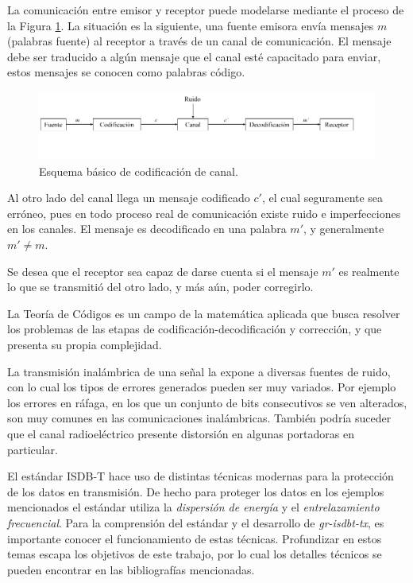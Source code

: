 La comunicación entre emisor y receptor puede modelarse mediante el proceso de la Figura \ref{diagrama_codificacion}. La situación es la siguiente, una fuente emisora envía mensajes $m$ (palabras fuente) al receptor a través de un canal de comunicación. El mensaje debe ser traducido a algún mensaje que el canal esté capacitado para enviar, estos mensajes se conocen como palabras código.

\begin{figure}
\centering
\includegraphics[scale=0.45]{figuras/cap02/diagrama_codificacion}
\caption{\label{diagrama_codificacion} Esquema básico de codificación de canal.}
\end{figure}

Al otro lado del canal llega un mensaje codificado $c'$, el cual seguramente sea erróneo, pues en todo proceso real de comunicación existe ruido e imperfecciones en los canales. El mensaje es decodificado en una palabra $m'$, y generalmente $m' \neq m$.

Se desea que el receptor sea capaz de darse cuenta si el mensaje $m'$ es realmente lo que se transmitió del otro lado, y más aún, poder corregirlo. 

La Teoría de Códigos es un campo de la matemática aplicada que busca resolver los problemas de las etapas de codificación-decodificación y corrección, y que presenta su propia complejidad.

La transmisión inalámbrica de una señal la expone a diversas fuentes de ruido, con lo cual los tipos de errores generados pueden ser muy variados. Por ejemplo los errores en ráfaga, en los que un conjunto de bits consecutivos se ven alterados, son muy comunes en las comunicaciones inalámbricas. También podría suceder que el canal radioeléctrico presente distorsión en algunas portadoras en particular.

El estándar ISDB-T hace uso de distintas técnicas modernas para la protección de los datos en transmisión. De hecho para proteger los datos en los ejemplos mencionados el estándar utiliza la \textit{dispersión de energía} y el  \textit{entrelazamiento frecuencial}. Para la comprensión del estándar y el desarrollo de \textit{gr-isdbt-tx}, es importante conocer el funcionamiento de estas técnicas. Profundizar en estos temas escapa los objetivos de este trabajo, por lo cual los detalles técnicos se pueden encontrar en las bibliografías mencionadas.

